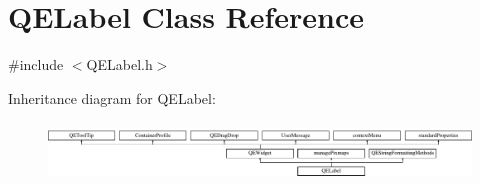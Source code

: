 \hypertarget{classQELabel}{
\section{QELabel Class Reference}
\label{classQELabel}
}


{\ttfamily \#include $<$QELabel.h$>$}

Inheritance diagram for QELabel:\begin{figure}[H]
\begin{center}
\leavevmode
\includegraphics[height=1.573034cm]{classQELabel}
\end{center}
\end{figure}
